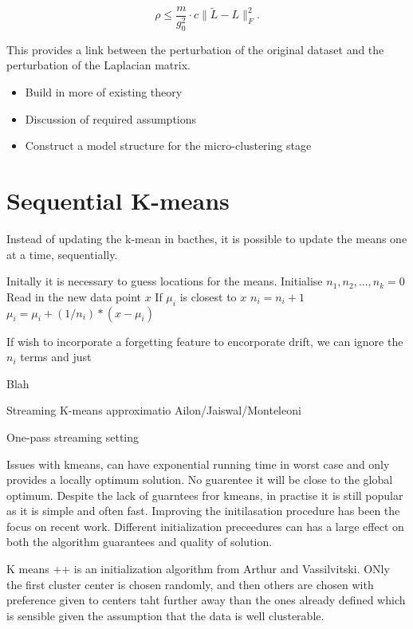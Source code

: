 \documentclass[a4document]{article}		%
\begin{document}
\begin{equation}
  \label{eq:KASPThm3}
  \rho \leq \frac{m}{g_0^2} \cdot c \| \tilde{L} - L \|_F^2.
\end{equation}

This provides a link between the perturbation of the original dataset and the perturbation of the Laplacian matrix. 

\begin{itemize}
\item Build in more of existing theory
\item Discussion of required assumptions
\item Construct a model structure for the micro-clustering stage
\end{itemize}

\newpage 

\section{Sequential K-means}

Instead of updating the k-mean in bacthes, it is possible to update the means one at a time, sequentially.

Initally it is necessary to guess locations for the means. 
Initialise $n_1, n_2, ..., n_k = 0$
   Read in the new data point $x$
    If $\mu_i$ is closest to $x$
        $n_i = n_i+1$
        $\mu_i = \mu_i + (1/n_i)*(x - \mu_i) $  


If wish to incorporate a forgetting feature to encorporate drift, we can ignore the $n_i$ terms and just 


Blah

Streaming K-means approximatio Ailon/Jaiswal/Monteleoni 

One-pass streaming setting





Issues with kmeans, can have exponential running time in worst case  and only provides a locally optimum solution. No guarentee it will be close to the global optimum. Despite the lack of guarntees fror kmeans,  in practise it is still popular as it is simple and often fast. Improving the initilasation procedure has been the focus on recent work. Different initialization preceedures can has a large effect on both the algorithm guarantees and quality of solution. 

K means ++ is an initialization algorithm from Arthur and Vassilvitski. ONly the first cluster center is chosen randomly, and then others are chosen with preference given to centers taht further away than the ones already defined which is sensible given the assumption that the data is well clusterable. 


\pagebreak											%

\end{document}
